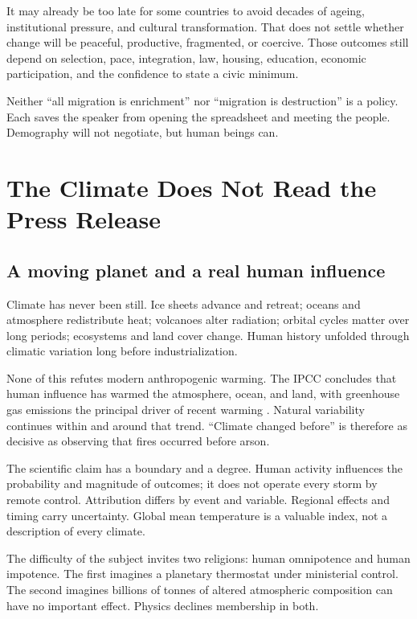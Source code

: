\documentclass[12pt,a4paper]{book}
\begin{document}
It may already be too late for some countries to avoid decades of ageing,
institutional pressure, and cultural transformation.  That does not settle
whether change will be peaceful, productive, fragmented, or coercive.  Those
outcomes still depend on selection, pace, integration, law, housing, education,
economic participation, and the confidence to state a civic minimum.

Neither ``all migration is enrichment'' nor ``migration is destruction'' is a
policy.  Each saves the speaker from opening the spreadsheet and meeting the
people.  Demography will not negotiate, but human beings can.

\chapter{The Climate Does Not Read the Press Release}
\label{chap:climate-press-release}

\section{A moving planet and a real human influence}

Climate has never been still.  Ice sheets advance and retreat; oceans and
atmosphere redistribute heat; volcanoes alter radiation; orbital cycles matter
over long periods; ecosystems and land cover change.  Human history unfolded
through climatic variation long before industrialization.

None of this refutes modern anthropogenic warming.  The IPCC concludes that
human influence has warmed the atmosphere, ocean, and land, with greenhouse
gas emissions the principal driver of recent warming
\cite{IPCC2021HumanInfluence,IPCC2023Synthesis}.  Natural variability continues
within and around that trend.  ``Climate changed before'' is therefore as
decisive as observing that fires occurred before arson.

The scientific claim has a boundary and a degree.  Human activity influences
the probability and magnitude of outcomes; it does not operate every storm by
remote control.  Attribution differs by event and variable.  Regional effects
and timing carry uncertainty.  Global mean temperature is a valuable index,
not a description of every climate.

The difficulty of the subject invites two religions: human omnipotence and
human impotence.  The first imagines a planetary thermostat under ministerial
control.  The second imagines billions of tonnes of altered atmospheric
composition can have no important effect.  Physics declines membership in
both.
\end{document}
